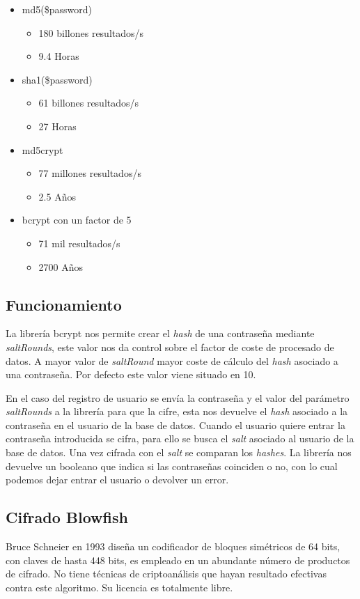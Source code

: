 \begin{itemize}
\item md5(\$password) 
\begin{itemize}
\item 180 billones resultados/s
\item 9.4 Horas
\end{itemize}
\item sha1(\$password)
\begin{itemize}
\item 61 billones resultados/s
\item 27 Horas
\end{itemize}
\item md5crypt
\begin{itemize}
\item 77 millones resultados/s
\item 2.5 Años
\end{itemize}
\item bcrypt con un factor de 5 
\begin{itemize}
\item 71 mil resultados/s
\item 2700 Años
\end{itemize}
\end{itemize}


\subsection{Funcionamiento}
La librería bcrypt nos permite crear el \textit{hash} de una contraseña mediante \textit{saltRounds}, este valor nos da control sobre el factor de coste de procesado de datos. A mayor valor de \textit{saltRound} mayor coste de cálculo del \textit{hash} asociado a una contraseña.  Por defecto este valor viene situado en 10. 


En el caso del registro de usuario se envía la contraseña y el valor del parámetro \textit{saltRounds} a la librería para que la cifre, esta nos devuelve el \textit{hash} asociado a la contraseña en el usuario de la base de datos. Cuando el usuario quiere entrar la contraseña introducida se cifra, para ello se busca el \textit{salt} asociado al usuario de la base de datos. Una vez cifrada con el \textit{salt} se comparan los \textit{hashes}. La librería nos devuelve un booleano que indica si las contraseñas coinciden o no, con lo cual podemos dejar entrar el usuario o devolver un error.


\subsection{Cifrado Blowfish}
Bruce Schneier en 1993 diseña un codificador de bloques simétricos de 64 bits, con claves de hasta 448 bits, es empleado en un abundante número de productos de cifrado. No tiene técnicas de criptoanálisis que hayan resultado efectivas contra este algoritmo. Su licencia es totalmente libre.


